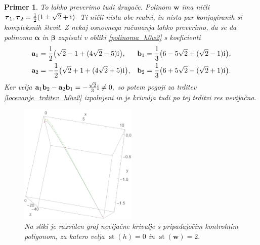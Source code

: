 \documentclass[12pt,a4paper,twoside]{article}
\newcommand{\iu}{\mathrm{i}\mkern1mu} %
\theoremstyle{definition} %
\theoremstyle{plain} %
\theoremstyle{primerstyle}
\newtheorem{primer}[definicija]{Primer}
\numberwithin{equation}{section}  %
\newcommand{\aV}{\mathbf{a}}
\newcommand{\bV}{\mathbf{b}}
\newcommand{\wV}{\mathbf{w}}
\newcommand{\balpha}{\boldsymbol \alpha}
\newcommand{\bbeta}{\boldsymbol \beta}
\newcommand{\btau}{\boldsymbol \tau}
\DeclareMathOperator{\st}{st}
\begin{document}
\begin{primer}
	To lahko preverimo tudi drugače. Polinom $\wV$ ima ničli $\btau_1,\btau_2=\frac{1}{2}(1\pm\sqrt{2}+\iu).$ Ti ničli nista obe realni, in nista par konjugiranih si kompleksnih števil. Z nekaj osnovnega računanja lahko preverimo, da se da polinoma $\balpha$ in $\bbeta$ zapisati v obliki \eqref{polinoma_h0w2} s koeficienti
	\begin{align*}
		\aV_1&=\frac{1}{2}\big(\sqrt{2}-1+(4\sqrt{2}-5)\iu\big),&\bV_1&=\frac{1}{3}\big(6-5\sqrt{2}+(\sqrt{2}-1)\iu\big),\\
		\aV_2&=-\frac{1}{2}\big(\sqrt{2}+1+(4\sqrt{2}+5)\iu\big),&\bV_2&=\frac{1}{3}\big(6+5\sqrt{2}-(\sqrt{2}+1)\iu\big).
	\end{align*}
	Ker velja $\aV_1\bV_2-\aV_2\bV_1=-\frac{\sqrt{2}}{3}\iu\neq 0,$ so potem pogoji za trditev \ref{locevanje_trditev_h0w2} izpolnjeni in je krivulja tudi po tej trditvi res nevijačna.
	\begin{figure}[h]
	  \centering
	  \includegraphics[width=0.5\textwidth]{images/h0w2_nevijacna.pdf}
	  \caption[Primer nevijačne krivulje ($\st(h)=4,$ $\st(\wV)=0$)]{Na sliki je razviden graf nevijačne krivulje s pripadajočim kontrolnim poligonom, za katero velja $\st(h)=0$ in $\st(\wV)=2.$}
	  \label{fig:h0w2_nevijacna}
	\end{figure}
\end{primer}
\end{document}
